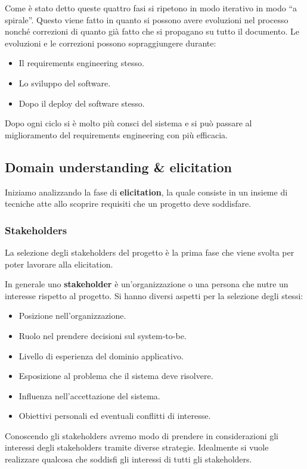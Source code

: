 Come è stato detto queste quattro fasi si ripetono in modo iterativo in modo “a
spirale”. Questo viene fatto in quanto si possono avere evoluzioni nel processo
nonché correzioni di quanto già fatto che si propagano su tutto il documento. Le
evoluzioni e le correzioni possono sopraggiungere durante:
\begin{itemize}
    \item Il requirements engineering stesso.
    \item Lo sviluppo del software.
    \item Dopo il deploy del software stesso.
\end{itemize}
Dopo ogni ciclo si è molto più consci del sistema e si può passare al miglioramento
del requirements engineering con più efficacia.
\subsection{Domain understanding \& elicitation}
Iniziamo analizzando la fase di \textbf{elicitation}, la quale consiste in un
insieme di tecniche atte allo scoprire requisiti che un progetto deve soddisfare.
\subsubsection{Stakeholders}
La selezione degli stakeholders del progetto è la prima fase che viene svolta
per poter lavorare alla elicitation.
\begin{definizione}
    In generale uno \textbf{stakeholder} è un'organizzazione o una persona che
    nutre un interesse rispetto al progetto. Si hanno diversi aspetti per la
    selezione degli stessi:
    \begin{itemize}
        \item Posizione nell'organizzazione.
        \item Ruolo nel prendere decisioni sul system-to-be.
        \item Livello di esperienza del dominio applicativo.
        \item Esposizione al problema che il sistema deve risolvere.
        \item Influenza nell'accettazione del sistema.
        \item Obiettivi personali ed eventuali conflitti di interesse.
    \end{itemize}
\end{definizione}
Conoscendo gli stakeholders avremo modo di prendere in considerazioni gli interessi
degli stakeholders tramite diverse strategie. Idealmente si vuole realizzare
qualcosa che soddisfi gli interessi di tutti gli stakeholders.

